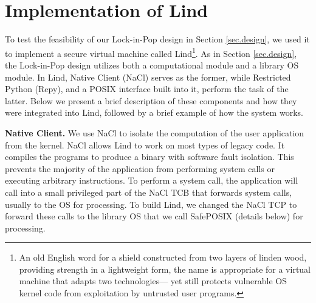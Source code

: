 \section{Implementation of Lind}
\label{sec.implementation}

To test the feasibility of our Lock-in-Pop design in
Section \ref{sec.design}, we used it to implement a secure virtual machine
called Lind\footnote{\scriptsize An old English word for a shield constructed from two layers of
linden wood, providing strength in a lightweight form, the name is appropriate for
a virtual machine that adapts two technologies—\textendash
yet still protects vulnerable OS kernel code from exploitation by
untrusted user programs.}. 
%
As in Section \ref{sec.design}, the Lock-in-Pop design utilizes both a
computational module and a library OS module. In Lind, Native Client (NaCl) serves as the former,
while Restricted Python (Repy), and a POSIX interface built into it, perform the task of the latter.
Below we present a brief description of these components and how they were integrated
into Lind, followed by a brief example of how the system works.

\textbf{Native Client.}
We use NaCl to isolate the computation of the user application
from the kernel. NaCl allows Lind to work on most types of legacy code.
It compiles the programs to produce a binary with software fault isolation.
This prevents the majority of the application from performing system calls
or executing arbitrary instructions.
%
To perform a system call, the application will call into a small privileged
part of the NaCl TCB that forwards system calls, usually to the OS for
processing. To build Lind, we changed the NaCl TCP to
forward these calls to the library OS that we call SafePOSIX (details below)
for processing.

